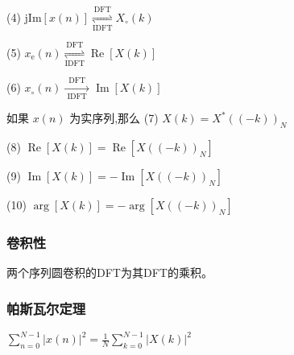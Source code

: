 \documentclass{../source/Experiment}
\begin{document}
            (4) $\mathrm{jIm}[x(n)] \underset{\mathrm{IDFT}}{\stackrel{\mathrm{DFT}}{\rightleftharpoons}} X_{\circ}(k)$

            (5) $x_{\mathrm{e}}(n) \underset{\mathrm{IDFT}}{\stackrel{\mathrm{DFT}}{\rightleftharpoons}} \operatorname{Re}[X(k)]$

            (6) $x_{\circ}(n) \underset{\text { IDFT }}{\stackrel{\text { DFT }}{\longrightarrow}} \operatorname{Im}[X(k)]$

            如果 $x(n)$ 为实序列,那么
            (7) $X(k)=X^{*}((-k))_{N}$

            (8) $\operatorname{Re}[X(k)]=\operatorname{Re}\left[X((-k))_{N}\right]$

            (9) $\operatorname{Im}[X(k)]=-\operatorname{Im}\left[X((-k))_{N}\right]$

            (10) $\arg [X(k)]=-\arg \left[X((-k))_{N}\right]$
            \subsubsection{卷积性}
            两个序列圆卷积的DFT为其DFT的乘积。
            \subsubsection{帕斯瓦尔定理}
            $\sum_{n=0}^{N-1}|x(n)|^{2}=\frac{1}{N} \sum_{k=0}^{N-1}|X(k)|^{2}$
 
\end{document}
